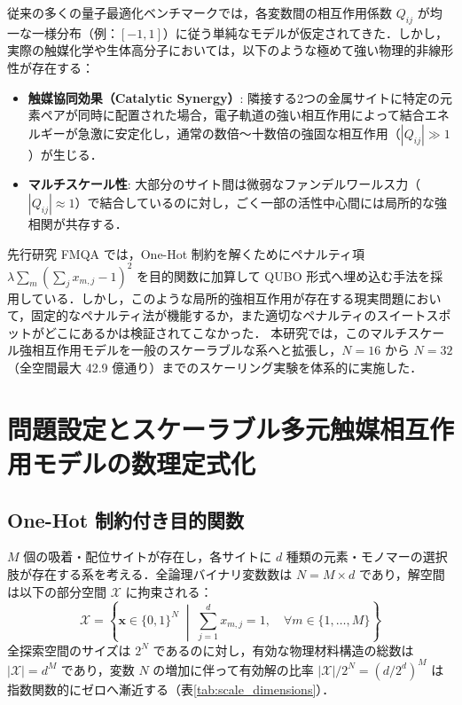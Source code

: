 \documentclass[11pt,a4paper]{ltjsarticle}
\begin{document}
従来の多くの量子最適化ベンチマークでは，各変数間の相互作用係数 $Q_{ij}$ が均一な一様分布（例：$[-1, 1]$）に従う単純なモデルが仮定されてきた．しかし，実際の触媒化学や生体高分子においては，以下のような極めて強い物理的非線形性が存在する：
\begin{itemize}\setlength{\itemsep}{1.5pt}
    \item \textbf{触媒協同効果（Catalytic Synergy）}: 隣接する2つの金属サイトに特定の元素ペアが同時に配置された場合，電子軌道の強い相互作用によって結合エネルギーが急激に安定化し，通常の数倍〜十数倍の強固な相互作用（$|Q_{ij}| \gg 1$）が生じる．
    \item \textbf{マルチスケール性}: 大部分のサイト間は微弱なファンデルワールス力（$|Q_{ij}| \approx 1$）で結合しているのに対し，ごく一部の活性中心間には局所的な強相関が共存する．
\end{itemize}

先行研究 FMQA \cite{kitai2020} では，One-Hot 制約を解くためにペナルティ項 $\lambda \sum_{m} (\sum_{j} x_{m,j} - 1)^2$ を目的関数に加算して QUBO 形式へ埋め込む手法を採用している．しかし，このような局所的強相互作用が存在する現実問題において，固定的なペナルティ法が機能するか，また適切なペナルティのスイートスポットがどこにあるかは検証されてこなかった．
本研究では，このマルチスケール強相互作用モデルを一般のスケーラブルな系へと拡張し，$N=16$ から $N=32$（全空間最大 42.9 億通り）までのスケーリング実験を体系的に実施した．

\section{問題設定とスケーラブル多元触媒相互作用モデルの数理定式化}
\label{sec:formulation}

\subsection{One-Hot 制約付き目的関数}
$M$ 個の吸着・配位サイトが存在し，各サイトに $d$ 種類の元素・モノマーの選択肢が存在する系を考える．全論理バイナリ変数数は $N = M \times d$ であり，解空間は以下の部分空間 $\mathcal{X}$ に拘束される：
\begin{equation}
\mathcal{X} = \left\{ \bm{x} \in \{0, 1\}^N \;\middle|\; \sum_{j=1}^d x_{m, j} = 1, \quad \forall m \in \{1, \dots, M\} \right\}
\end{equation}
全探索空間のサイズは $2^N$ であるのに対し，有効な物理材料構造の総数は $|\mathcal{X}| = d^M$ であり，変数 $N$ の増加に伴って有効解の比率 $|\mathcal{X}| / 2^N = (d/2^d)^M$ は指数関数的にゼロへ漸近する（表\ref{tab:scale_dimensions}）．
\end{document}
